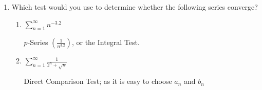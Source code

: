 \documentclass{nosvagor-notes}
\begin{document}
\begin{enumerate}
  \item Which test would you use to determine whether the following series converge?
  \begin{enumerate}
    \item \(\displaystyle \sum_{n=1}^{\infty} n^{-3.2}\)
      \vspace{16pt}

      \(p\)-Series \(\left( \frac{1}{n^{3.2}} \right) \), or the Integral Test.

      \vspace{60pt}

    \item \(\displaystyle \sum_{n=1}^{\infty} \frac{1}{2^n + \sqrt{n} }\)

      \vspace{16pt}
      Direct Comparison Test; as it is easy to choose \(a_n\) and \(b_n\)
  \end{enumerate}

\end{enumerate}
\end{document}
